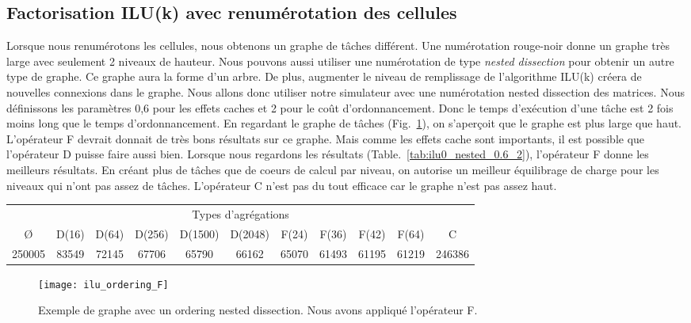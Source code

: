 \subsection{Factorisation ILU(k) avec renumérotation des cellules}
Lorsque nous renumérotons les cellules, nous obtenons un graphe de tâches différent.
%
Une numérotation rouge-noir donne un graphe très large avec seulement 2 niveaux de hauteur.
%
Nous pouvons aussi utiliser une numérotation de type {\em nested dissection} pour obtenir un autre type de graphe.
%
Ce graphe aura la forme d'un arbre.
%
De plus, augmenter le niveau de remplissage de l'algorithme ILU(k) créera de nouvelles connexions dans le graphe.
%
Nous allons donc utiliser notre simulateur avec une numérotation nested dissection des matrices.
%
Nous définissons les paramètres 0,6 pour les effets caches et 2 pour le coût d'ordonnancement.
%
Donc le temps d'exécution d'une tâche est 2 fois moins long que le temps d'ordonnancement.
%
En regardant le graphe de tâches (Fig.~\ref{fig:ilu_ordering_F}), on s'aperçoit que le graphe est plus large que haut.
%
L'opérateur F devrait donnait de très bons résultats sur ce graphe.
%
Mais comme les effets cache sont importants, il est possible que l'opérateur D puisse faire aussi bien.
%
Lorsque nous regardons les résultats (Table.~\ref{tab:ilu0_nested_0.6_2}), l'opérateur F donne les meilleurs résultats.
%
En créant plus de tâches que de coeurs de calcul par niveau, on autorise un meilleur équilibrage de charge pour les niveaux qui n'ont pas assez de tâches.
%
L'opérateur C n'est pas du tout efficace car le graphe n'est pas assez haut.


\begin{center}
  \begin{tabular}{|c|c|c|c|c|c|c|c|c|c|c|}
    \hline
    \multicolumn{11}{|c|}{Types d'agrégations}\\
    \O & D(16) & D(64) & D(256) & D(1500) & D(2048) & F(24) & F(36) & F(42) & F(64) & C \\
    \hline
    250005 & 83549 & 72145 & 67706 & 65790 & 66162 & 65070 & 61493 & 61195 & 61219 & 246386 \\
    \hline
  \end{tabular}
  \label{tab:ilu0_nested_0.6_2}
\end{center}


\begin{figure}[t!]
  \centering
  \texttt{[image: ilu\_ordering\_F]}
  \caption{Exemple de graphe avec un ordering nested dissection. Nous avons appliqué l'opérateur F.}
  \label{fig:ilu_ordering_F}
\end{figure}


